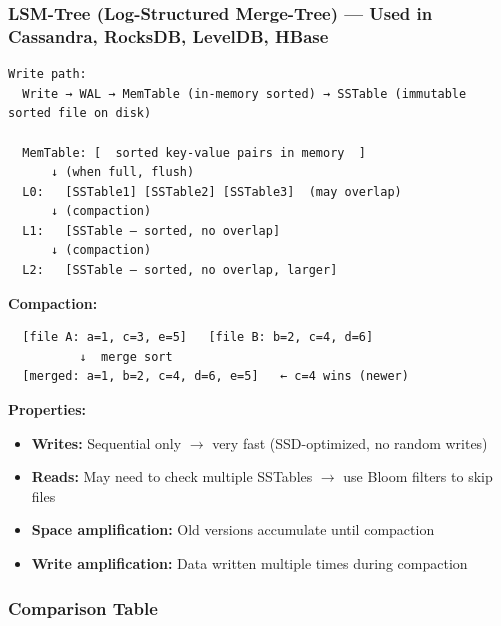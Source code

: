 \documentclass[11pt]{article}
\providecommand{\tightlist}{\setlength{\itemsep}{1pt}\setlength{\parskip}{0pt}}
\begin{document}
\subsubsection{LSM-Tree (Log-Structured Merge-Tree) --- Used in Cassandra, RocksDB, LevelDB, HBase}\label{lsm-tree-log-structured-merge-tree--used-in-cassandra-rocksdb-leveldb-hbase}

\setcodelang{}

\begin{verbatim}
Write path:
  Write → WAL → MemTable (in-memory sorted) → SSTable (immutable sorted file on disk)

  MemTable: [  sorted key-value pairs in memory  ]
      ↓ (when full, flush)
  L0:   [SSTable1] [SSTable2] [SSTable3]  (may overlap)
      ↓ (compaction)
  L1:   [SSTable — sorted, no overlap]
      ↓ (compaction)
  L2:   [SSTable — sorted, no overlap, larger]
\end{verbatim}

\textbf{Compaction:}

\setcodelang{}

\begin{verbatim}
  [file A: a=1, c=3, e=5]   [file B: b=2, c=4, d=6]
          ↓  merge sort
  [merged: a=1, b=2, c=4, d=6, e=5]   ← c=4 wins (newer)
\end{verbatim}

\textbf{Properties:}

\begin{itemize}
\tightlist
\item
  \textbf{Writes:} Sequential only \(\rightarrow\) very fast (SSD-optimized, no random writes)
\item
  \textbf{Reads:} May need to check multiple SSTables \(\rightarrow\) use Bloom filters to skip files
\item
  \textbf{Space amplification:} Old versions accumulate until compaction
\item
  \textbf{Write amplification:} Data written multiple times during compaction
\end{itemize}

\subsubsection{Comparison Table}\label{comparison-table}
\end{document}
